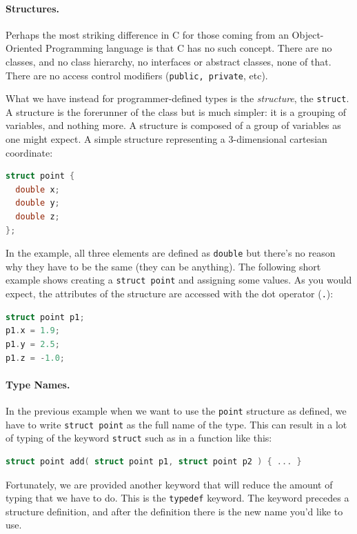 \documentclass[a4paper]{report}
\begin{document}
\paragraph{Structures.} Perhaps the most striking difference in C for those coming from an Object-Oriented Programming language is that C has no such concept. There are no classes, and no class hierarchy, no interfaces or abstract classes, none of that. There are no access control modifiers (\texttt{public, private}, etc).

What we have instead for programmer-defined types is the \textit{structure}, the \texttt{struct}. A structure is the forerunner of the class but is much simpler: it is a grouping of variables, and nothing more. A structure is composed of a group of variables as one might expect. A simple structure representing a 3-dimensional cartesian coordinate:

\begin{lstlisting}[language=C]
struct point {
  double x;
  double y;
  double z;
};
\end{lstlisting}

In the example, all three elements are defined as \texttt{double} but there's no reason why they have to be the same (they can be anything). The following short example shows creating a \texttt{struct point} and assigning some values. As you would expect, the attributes of the structure are accessed with the dot operator (\texttt{.}):

\begin{lstlisting}[language=C]
struct point p1;
p1.x = 1.9;
p1.y = 2.5;
p1.z = -1.0;
\end{lstlisting}

\paragraph{Type Names.}
In the previous example when we want to use the \texttt{point} structure as defined, we have to write \texttt{struct point} as the full name of the type. This can result in a lot of typing of the keyword \texttt{struct} such as in a function like this:

\begin{lstlisting}[language=C]
struct point add( struct point p1, struct point p2 ) { ... }
\end{lstlisting}

Fortunately, we are provided another keyword that will reduce the amount of typing that we have to do. This is the \texttt{typedef} keyword. The keyword precedes a structure definition, and after the definition there is the new name you'd like to use.
\end{document}
